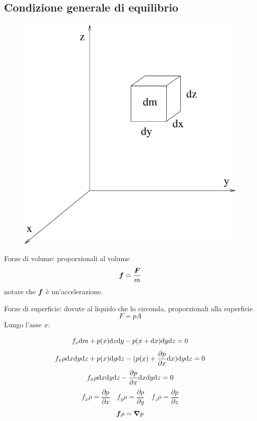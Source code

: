\subsection{Condizione generale di equilibrio}
\begin{figure}[htbp]
   \centering
   \includegraphics[scale=0.4]{immagini/fisica1/equilibrio}
\end{figure}
Forze di volume: proporzionali al volume
\begin{equation*}\boldsymbol{f}=\frac{\boldsymbol{F}}{m}\end{equation*}
notare che $\boldsymbol{f}$ è un'accelerazione.


Forze di superficie: dovute al liquido che lo circonda, proporzionali alla superficie
\begin{equation*}F=pA\end{equation*}
Lungo l'asse $x$:

\begin{equation*}f_x\mathrm{d} m+p(x)\mathrm{d} z\mathrm{d} y-p(x+\mathrm{d} x)\mathrm{d} y\mathrm{d} z=0\end{equation*}
\begin{equation*}f_x\rho\mathrm{d} x\mathrm{d} y\mathrm{d} z+p(x)\mathrm{d} y\mathrm{d} z-(p(x)+\frac{\partial p}{\partial x}\mathrm{d} x)\mathrm{d} y\mathrm{d} z=0\end{equation*}
\begin{equation*}f_x\rho\mathrm{d} x\mathrm{d} y\mathrm{d} z-\frac{\partial p}{\partial {x}}\mathrm{d} x\mathrm{d} y\mathrm{d} z=0\end{equation*}
\begin{equation*}f_x\rho=\frac{\partial p}{\partial x}\quad f_y\rho=\frac{\partial p}{\partial y}\quad f_z\rho=\frac{\partial p}{\partial z}\end{equation*}
\begin{equation}\boldsymbol{f}\rho=\boldsymbol{\nabla} p\end{equation}


